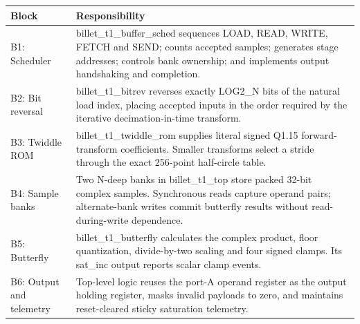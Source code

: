 \documentclass[11pt,a4paper]{article}
\begin{document}
{\small\renewcommand{\arraystretch}{1.18}\begin{longtable}{@{}L{0.24\textwidth}|L{0.7\textwidth}@{}}\toprule

\textbf{Block} & \textbf{Responsibility}\\\midrule\endhead

B1: Scheduler & billet\_\allowbreak{}t1\_\allowbreak{}buffer\_\allowbreak{}sched sequences LOAD,\allowbreak{} READ,\allowbreak{} WRITE,\allowbreak{} FETCH and SEND; counts accepted samples; generates stage addresses; controls bank ownership; and implements output handshaking and completion.\\[2pt]\hline

B2: Bit reversal & billet\_\allowbreak{}t1\_\allowbreak{}bitrev reverses exactly LOG2\_\allowbreak{}N bits of the natural load index,\allowbreak{} placing accepted inputs in the order required by the iterative decimation-in-time transform.\\[2pt]\hline

B3: Twiddle ROM & billet\_\allowbreak{}t1\_\allowbreak{}twiddle\_\allowbreak{}rom supplies literal signed Q1.15 forward-transform coefficients. Smaller transforms select a stride through the exact 256-point half-circle table.\\[2pt]\hline

B4: Sample banks & Two N-deep banks in billet\_\allowbreak{}t1\_\allowbreak{}top store packed 32-bit complex samples. Synchronous reads capture operand pairs; alternate-bank writes commit butterfly results without read-during-write dependence.\\[2pt]\hline

B5: Butterfly & billet\_\allowbreak{}t1\_\allowbreak{}butterfly calculates the complex product,\allowbreak{} floor quantization,\allowbreak{} divide-by-two scaling and four signed clamps. Its sat\_\allowbreak{}inc output reports scalar clamp events.\\[2pt]\hline

B6: Output and telemetry & Top-level logic reuses the port-A operand register as the output holding register,\allowbreak{} masks invalid payloads to zero,\allowbreak{} and maintains reset-cleared sticky saturation telemetry.\\[2pt]\hline

\bottomrule\end{longtable}}
\end{document}

